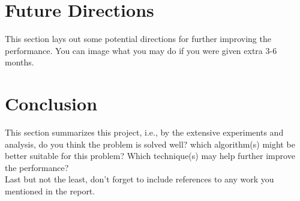 \documentclass[conference]{IEEEtran}
\begin{document}
\section{Future Directions}
This section lays out some potential directions for further improving the performance. You can image what you may do if you were given extra 3-6 months.

\section{Conclusion}
This section summarizes this project, i.e., by the extensive experiments and analysis, do you think the problem is solved well? which algorithm(s) might be better suitable for this problem? Which technique(s) may help further improve the performance? \\

Last but not the least, don't forget to include references to any work you mentioned in the report.




\end{document}
